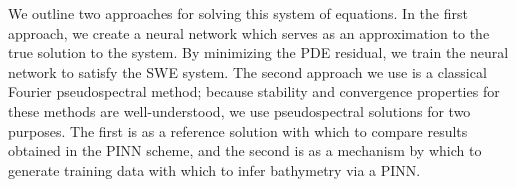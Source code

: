 We outline two approaches for solving this system of equations. In the first approach, we create a neural network which 
serves as an approximation to the true solution to the system. By minimizing the PDE residual, we train the neural 
network to satisfy the SWE system. The second approach we use is a classical Fourier pseudospectral method; because 
stability and convergence properties for these methods are well-understood, we use pseudospectral solutions for two 
purposes. The first is as a reference solution with which to compare results obtained in the PINN scheme, and
the second is as a mechanism by which to generate training data with which to infer bathymetry via a PINN. 